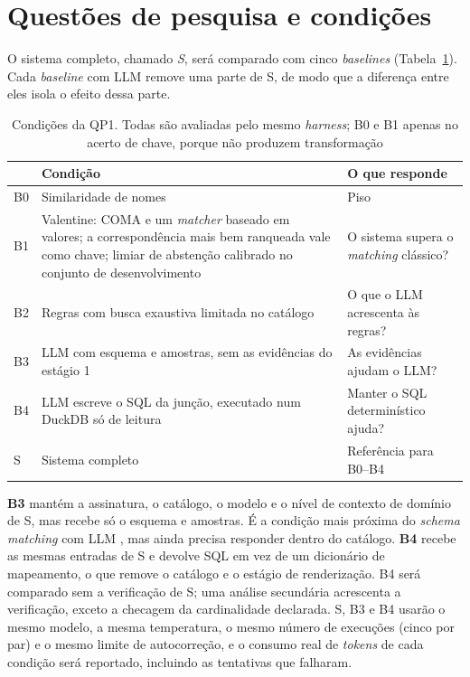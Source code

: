 \section{Questões de pesquisa e condições}
\label{sec:metodologia-condicoes}

O sistema completo, chamado \emph{S}, será comparado com cinco
\emph{baselines} (Tabela~\ref{tab:condicoes}). Cada \emph{baseline} com LLM
remove uma parte de S, de modo que a diferença entre eles isola o efeito
dessa parte.

\begin{table}[htbp]
\centering
\caption{Condições da QP1. Todas são avaliadas pelo mesmo \emph{harness}; B0
e B1 apenas no acerto de chave, porque não produzem transformação}
\label{tab:condicoes}
\footnotesize
\begin{tabularx}{\textwidth}{@{}l>{\raggedright\arraybackslash}X>{\raggedright\arraybackslash}p{}@{}}
\toprule
& \textbf{Condição} & \textbf{O que responde} \\
\midrule
B0 & Similaridade de nomes & Piso \\
B1 & Valentine: COMA e um \emph{matcher} baseado em valores; a correspondência mais bem ranqueada vale como chave; limiar de abstenção calibrado no conjunto de desenvolvimento & O sistema supera o \emph{matching} clássico? \\
B2 & Regras com busca exaustiva limitada no catálogo & O que o LLM acrescenta às regras? \\
B3 & LLM com esquema e amostras, sem as evidências do estágio 1 & As evidências ajudam o LLM? \\
B4 & LLM escreve o SQL da junção, executado num DuckDB só de leitura & Manter o SQL determinístico ajuda? \\
S & Sistema completo & Referência para B0--B4 \\
\bottomrule
\end{tabularx}
\end{table}

\textbf{B3} mantém a assinatura, o catálogo, o modelo e o nível de contexto de
domínio de S, mas recebe só o esquema e amostras. É a condição mais próxima do
\emph{schema matching} com LLM \cite{parciak2024schema}, mas ainda precisa
responder dentro do catálogo. \textbf{B4} recebe as mesmas entradas de S e
devolve SQL em vez de um dicionário de mapeamento, o que remove o catálogo e o
estágio de renderização. B4 será comparado sem a verificação de S; uma análise
secundária acrescenta a verificação, exceto a checagem da cardinalidade
declarada. S, B3 e B4 usarão o mesmo modelo, a mesma temperatura, o mesmo
número de execuções (cinco por par) e o mesmo limite de autocorreção, e o
consumo real de \emph{tokens} de cada condição será reportado, incluindo as
tentativas que falharam.

